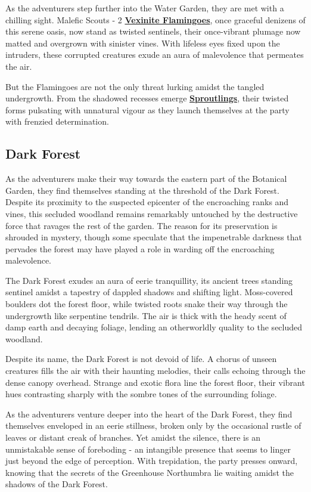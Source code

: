 As the adventurers step further into the Water Garden, they are met with a chilling sight. Malefic Scouts - 2 \hyperref[sec:VexiniteFlamingo]{\textbf{Vexinite Flamingoes}}, once graceful denizens of this serene oasis, now stand as twisted sentinels, their once-vibrant plumage now matted and overgrown with sinister vines. With lifeless eyes fixed upon the intruders, these corrupted creatures exude an aura of malevolence that permeates the air.

But the Flamingoes are not the only threat lurking amidst the tangled undergrowth. From the shadowed recesses emerge  \hyperref[sec:ZombifiedFlamingo]{\textbf{Sproutlings}}, their twisted forms pulsating with unnatural vigour as they launch themselves at the party with frenzied determination.

\subsection*{Dark Forest}
As the adventurers make their way towards the eastern part of the Botanical Garden, they find themselves standing at the threshold of the Dark Forest. Despite its proximity to the suspected epicenter of the encroaching ranks and vines, this secluded woodland remains remarkably untouched by the destructive force that ravages the rest of the garden. The reason for its preservation is shrouded in mystery, though some speculate that the impenetrable darkness that pervades the forest may have played a role in warding off the encroaching malevolence.

The Dark Forest exudes an aura of eerie tranquillity, its ancient trees standing sentinel amidst a tapestry of dappled shadows and shifting light. Moss-covered boulders dot the forest floor, while twisted roots snake their way through the undergrowth like serpentine tendrils. The air is thick with the heady scent of damp earth and decaying foliage, lending an otherworldly quality to the secluded woodland.

Despite its name, the Dark Forest is not devoid of life. A chorus of unseen creatures fills the air with their haunting melodies, their calls echoing through the dense canopy overhead. Strange and exotic flora line the forest floor, their vibrant hues contrasting sharply with the sombre tones of the surrounding foliage.

As the adventurers venture deeper into the heart of the Dark Forest, they find themselves enveloped in an eerie stillness, broken only by the occasional rustle of leaves or distant creak of branches. Yet amidst the silence, there is an unmistakable sense of foreboding - an intangible presence that seems to linger just beyond the edge of perception. With trepidation, the party presses onward, knowing that the secrets of the Greenhouse Northumbra lie waiting amidst the shadows of the Dark Forest.

